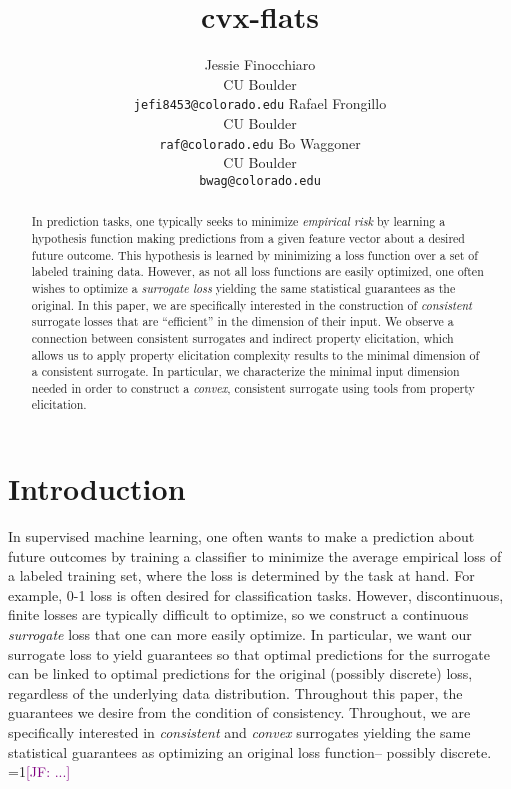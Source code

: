 \documentclass{article}
\title{cvx-flats}
\author{%
  Jessie Finocchiaro\\
  CU Boulder\\
  \texttt{jefi8453@colorado.edu} 
  \And
   Rafael Frongillo\\
   CU Boulder\\
   \texttt{raf@colorado.edu} 
   \And
   Bo Waggoner\\
   CU Boulder \\
   \texttt{bwag@colorado.edu} 
}
\newcommand{\Comments}{1}
\newcommand{\mynote}[2]{\ifnum\Comments=1\textcolor{#1}{#2}\fi}
\newcommand{\jessie}[1]{\mynote{purple}{[JF: #1]}}
\begin{document}
\maketitle

\begin{abstract}
	In prediction tasks, one typically seeks to minimize \emph{empirical risk} by learning a hypothesis function making predictions from a given feature vector about a desired future outcome.
	This hypothesis is learned by minimizing a loss function over a set of labeled training data.
	However, as not all loss functions are easily optimized, one often wishes to optimize a \emph{surrogate loss} yielding the same statistical guarantees as the original.
	In this paper, we are specifically interested in the construction of \emph{consistent} surrogate losses that are ``efficient'' in the dimension of their input.
	We observe a connection between consistent surrogates and indirect property elicitation, which allows us to apply property elicitation complexity results to the minimal dimension of a consistent surrogate.
	In particular, we characterize the minimal input dimension needed in order to construct a \emph{convex}, consistent surrogate using tools from property elicitation.
\end{abstract}

\section{Introduction}\label{sec:intro}

In supervised machine learning, one often wants to make a prediction about future outcomes by training a classifier to minimize the average empirical loss of a labeled training set, where the loss is determined by the task at hand.
For example, 0-1 loss is often desired for classification tasks.
However, discontinuous, finite losses are typically difficult to optimize, so we construct a continuous \emph{surrogate} loss that one can more easily optimize.
In particular, we want our surrogate loss to yield guarantees so that optimal predictions for the surrogate can be linked to optimal predictions for the original (possibly discrete) loss, regardless of the underlying data distribution. 
Throughout this paper, the guarantees we desire from the condition of consistency.
Throughout, we are specifically interested in \emph{consistent} and \emph{convex} surrogates yielding the same statistical guarantees as optimizing an original loss function-- possibly discrete. 
\jessie{...}
\end{document}
